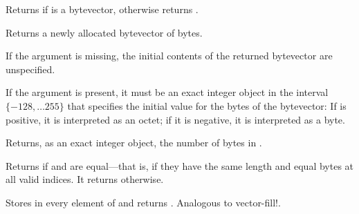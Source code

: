 \begin{entry}{%
}
   
Returns \schtrue{} if  is a bytevector,
otherwise returns \schfalse{}.
\end{entry}

\begin{entry}{%
}
   
Returns a newly allocated bytevector of  bytes.
   
If the  argument is missing, the initial contents of the
returned bytevector are unspecified.
   
If the  argument is present, it must be an exact integer
object in
the interval $\{-128, \ldots 255\}$ that specifies the initial value
for the bytes of the bytevector: If  is positive, it is
interpreted as an octet; if it is negative, it is interpreted as a byte.
\end{entry}   

\begin{entry}{%
}
   
Returns, as an exact integer object, the number of bytes in .
\end{entry}

\begin{entry}{%
}
   
Returns \schtrue{} if  and  are equal---that
is, if they have the same length and equal bytes at all valid indices.
It returns \schfalse{} otherwise.
\end{entry}

\begin{entry}{%
}

Stores  in every element of 
and returns \unspecifiedreturn.  Analogous to {\cf vector-fill!}.
\end{entry}


